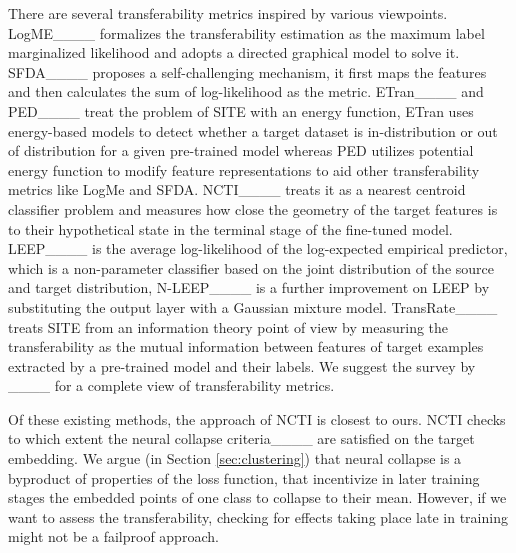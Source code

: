 There are several transferability metrics inspired by various viewpoints. LogME____ formalizes the transferability
estimation as the maximum label marginalized likelihood
and adopts a directed graphical model to solve it. SFDA____ proposes a self-challenging mechanism, it first maps the features and then calculates the sum of log-likelihood as the metric.  ETran____ and PED____ treat the problem of SITE with an energy function, ETran uses energy-based models to detect whether a target dataset is in-distribution or out of distribution for a given pre-trained model whereas PED utilizes potential energy function to modify feature representations to aid other transferability metrics like LogMe and SFDA. NCTI____ treats it as a nearest centroid classifier problem and measures how close the geometry of the target features is to their hypothetical state in the
terminal stage of the fine-tuned model. LEEP____ is the average log-likelihood of the log-expected empirical predictor, which is a non-parameter classifier based on the joint distribution of the source and target distribution, N-LEEP____ is a further improvement on LEEP by substituting the output layer with a Gaussian
mixture model. TransRate____ treats SITE from an information theory point of view by measuring the transferability as the mutual information between features of target examples extracted by a pre-trained model and their labels. We suggest the survey by ____ for a complete view of transferability metrics. 

Of these existing methods, the approach of NCTI is closest to ours. NCTI checks to which extent the neural collapse criteria____ are satisfied on the target embedding. %
We argue (in Section \ref{sec:clustering}) that neural collapse is a byproduct of properties of the loss function, that incentivize in later training stages the embedded points of one class to collapse to their mean. However, if we want to assess the transferability, checking for effects taking place late in training might not be a failproof approach.